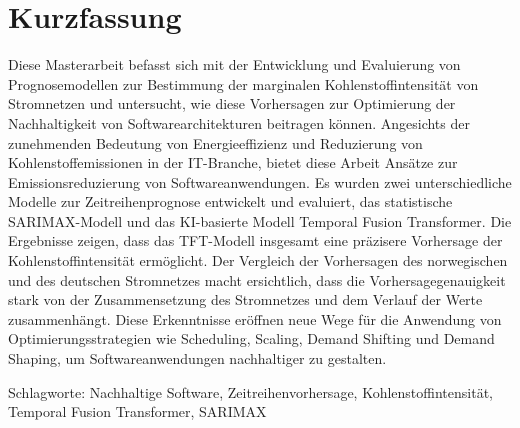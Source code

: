 \chapter*{Kurzfassung}
\thispagestyle{empty}
Diese Masterarbeit befasst sich mit der Entwicklung und Evaluierung von Prognosemodellen zur Bestimmung der marginalen Kohlenstoffintensität von Stromnetzen und untersucht, wie diese Vorhersagen zur Optimierung der Nachhaltigkeit von Softwarearchitekturen beitragen können.
Angesichts der zunehmenden Bedeutung von Energieeffizienz und Reduzierung von Kohlenstoffemissionen in der IT-Branche, bietet diese Arbeit Ansätze zur Emissionsreduzierung von Softwareanwendungen.
Es wurden zwei unterschiedliche Modelle zur Zeitreihenprognose entwickelt und evaluiert, das statistische SARIMAX-Modell und das KI-basierte Modell Temporal Fusion Transformer.
Die Ergebnisse zeigen, dass das TFT-Modell insgesamt eine präzisere Vorhersage der Kohlenstoffintensität ermöglicht.
Der Vergleich der Vorhersagen des norwegischen und des deutschen Stromnetzes macht ersichtlich, dass die Vorhersagegenauigkeit stark von der Zusammensetzung des Stromnetzes und dem Verlauf der Werte zusammenhängt.
Diese Erkenntnisse eröffnen neue Wege für die Anwendung von Optimierungsstrategien wie Scheduling, Scaling, Demand Shifting und Demand Shaping, um Softwareanwendungen nachhaltiger zu gestalten.

\bigskip

\noindent
Schlagworte: Nachhaltige Software, Zeitreihenvorhersage, Kohlenstoffintensität, Temporal Fusion Transformer, SARIMAX

